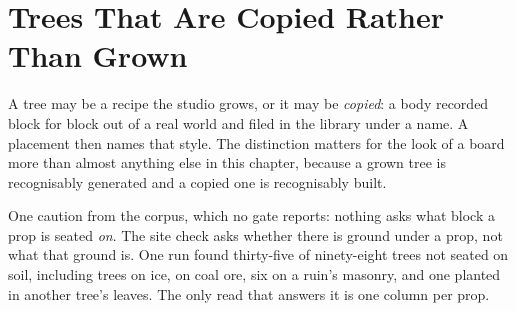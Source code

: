 \section{Trees That Are Copied Rather Than Grown}

A tree may be a recipe the studio grows, or it may be \emph{copied}: a body
recorded block for block out of a real world and filed in the library under a name.
A placement then names that style. The distinction matters for the look of a board
more than almost anything else in this chapter, because a grown tree is
recognisably generated and a copied one is recognisably built.

One caution from the corpus, which no gate reports: nothing asks what block a prop
is seated \emph{on}. The site check asks whether there is ground under a prop, not
what that ground is. One run found thirty-five of ninety-eight trees not seated on
soil, including trees on ice, on coal ore, six on a ruin's masonry, and one planted
in another tree's leaves. The only read that answers it is one column per prop.
